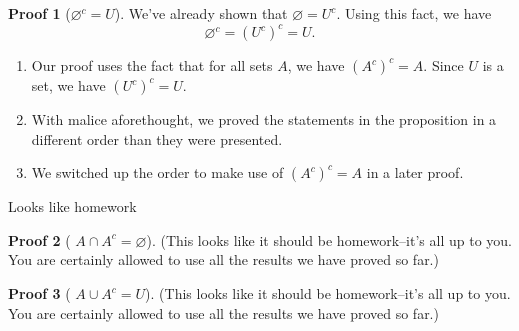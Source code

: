 \documentclass[fleqn]{beamer}
\theoremstyle{definition}
\newtheorem{myproof}{Proof}[]
\newenvironment{checklist}{
  \begin{enumerate}[\ding{51}]
    \addtolength{\itemsep}{-0.0\itemsep}}
  {\end{enumerate}}
\begin{document}
\begin{frame}

\begin{myproof}[\(  \varnothing^c = U\)]
We've already shown that \(\varnothing = U^c\).  Using this fact, we have
\[
 \varnothing^c  = (U^c)^c = U.
\]
\end{myproof}

\begin{checklist}

\item Our proof uses the fact that for all sets \(A\), we have \((A^c)^c = A\).  Since \(U\) is a set, we have \( (U^c)^c = U\).

\vspace{0.2in}
\item With malice aforethought, we proved the statements in the proposition in a different order than they were presented.

\vspace{0.2in}
\item  We switched up the order to make use of \((A^c)^c = A\) in a later proof.
\end{checklist}
\end{frame}

\begin{frame}{Looks like homework}


\begin{myproof}[  \(A \cap A^c = \varnothing\)]

(This looks like it should be homework--it's all up to you. You are certainly allowed to use all the results we have proved so far.)
\end{myproof}

\vspace{0.2in}

\begin{myproof}[  \(A \cup A^c = U \)]
(This looks like it should be homework--it's all up to you. You are certainly allowed to use all the results we have proved so far.)
\end{myproof}
\end{frame}
\end{document}
